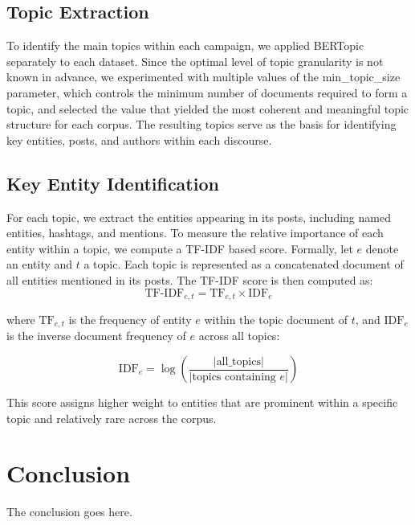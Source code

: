\documentclass[10pt,journal,compsoc]{IEEEtran}
\begin{document}
\subsection{Topic Extraction}
To identify the main topics within each campaign, we applied BERTopic~\cite{grootendorst2022bertopic} separately to each dataset. Since the optimal level of topic granularity is not known in advance, we experimented with multiple values of the min\_topic\_size parameter, which controls the minimum number of documents required to form a topic, and selected the value that yielded the most coherent and meaningful topic structure for each corpus. The resulting topics serve as the basis for identifying key entities, posts, and authors within each discourse.
\subsection{Key Entity Identification}
For each topic, we extract the entities appearing in its posts, including named entities, hashtags, and mentions. To measure the relative importance of each entity within a topic, we compute a TF-IDF based score.
Formally, let $e$ denote an entity and $t$ a topic. Each topic is represented as a concatenated document of all entities mentioned in its posts. The TF-IDF score is then computed as:
\begin{equation}
    \text{TF-IDF}_{e,t} = \text{TF}_{e,t} \times \text{IDF}_{e}
\end{equation}

where $\text{TF}_{e,t}$ is the frequency of entity $e$ within the topic document of $t$, and $\text{IDF}_{e}$ is the inverse document frequency of $e$ across all topics:

\begin{equation}
    \text{IDF}_{e} = \log\left(\frac{|\text{all\_topics}|}{|\text{topics containing } e|}\right)
\end{equation}

This score assigns higher weight to entities that are prominent within a specific topic and relatively rare across the corpus.
\section{Conclusion}
The conclusion goes here.





\end{document}
